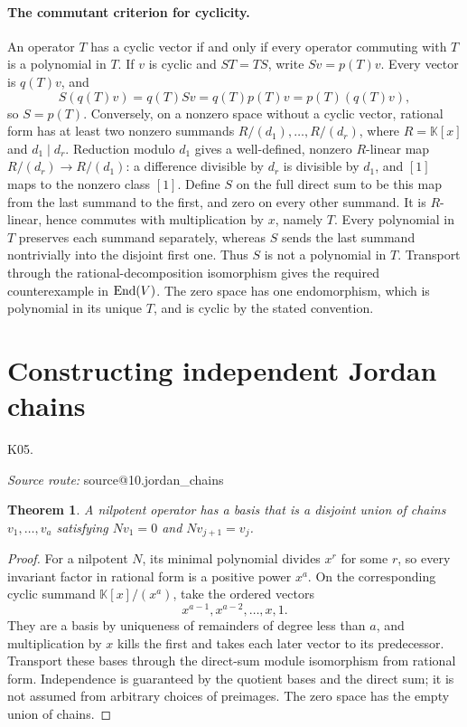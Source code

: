 \documentclass[11pt,a4paper]{book}
\makeatletter
\newtheorem{theorem}{Theorem}[chapter]
\theoremstyle{definition}\newtheorem{definition}[theorem]{Definition}
\theoremstyle{remark}\newtheorem{remark}[theorem]{Remark}
\newcommand{\K}{\mathbb K}\newcommand{\R}{\mathbb R}\newcommand{\C}{\mathbb C}
\newcommand{\Kentry}[2]{\section{#2}\label{k:#1}\noindent\textsf{\small K05.\detokenize{#1}}\par
  \begingroup\small\color{black!65}\textit{Source route: }\csname source@#1\endcsname\par\endgroup}
\makeatother
\begin{document}
\paragraph{The commutant criterion for cyclicity.}
An operator $T$ has a cyclic vector if and only if every operator commuting with $T$ is a polynomial in $T$.
If $v$ is cyclic and $ST=TS$, write $Sv=p(T)v$. Every vector is $q(T)v$, and
\[S(q(T)v)=q(T)Sv=q(T)p(T)v=p(T)(q(T)v),
\]
so $S=p(T)$. Conversely, on a nonzero space without a cyclic vector, rational form has at least two nonzero summands $R/(d_1),\ldots,R/(d_r)$, where $R=\K[x]$ and $d_1\mid d_r$. Reduction modulo $d_1$ gives a well-defined, nonzero $R$-linear map $R/(d_r)\to R/(d_1)$: a difference divisible by $d_r$ is divisible by $d_1$, and $[1]$ maps to the nonzero class $[1]$. Define $S$ on the full direct sum to be this map from the last summand to the first, and zero on every other summand. It is $R$-linear, hence commutes with multiplication by $x$, namely $T$. Every polynomial in $T$ preserves each summand separately, whereas $S$ sends the last summand nontrivially into the disjoint first one. Thus $S$ is not a polynomial in $T$. Transport through the rational-decomposition isomorphism gives the required counterexample in $\operatorname{End}(V)$. The zero space has one endomorphism, which is polynomial in its unique $T$, and is cyclic by the stated convention.

\Kentry{10.jordan_chains}{Constructing independent Jordan chains}
\begin{theorem}
A nilpotent operator has a basis that is a disjoint union of chains $v_1,\ldots,v_a$ satisfying $Nv_1=0$ and $Nv_{j+1}=v_j$.
\end{theorem}
\begin{proof}
For a nilpotent $N$, its minimal polynomial divides $x^r$ for some $r$, so every invariant factor in rational form is a positive power $x^a$. On the corresponding cyclic summand $\K[x]/(x^a)$, take the ordered vectors
\[x^{a-1},x^{a-2},\ldots,x,1.\]
They are a basis by uniqueness of remainders of degree less than $a$, and multiplication by $x$ kills the first and takes each later vector to its predecessor. Transport these bases through the direct-sum module isomorphism from rational form. Independence is guaranteed by the quotient bases and the direct sum; it is not assumed from arbitrary choices of preimages. The zero space has the empty union of chains.
\end{proof}
\end{document}
